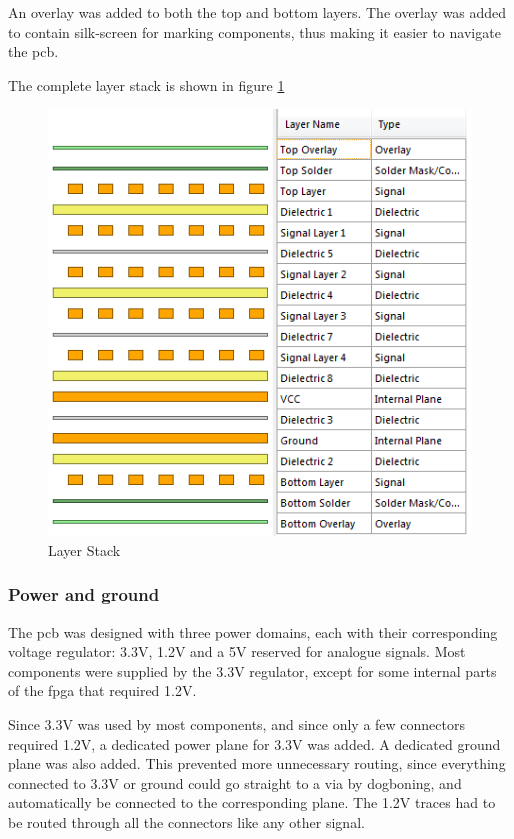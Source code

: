 An overlay was added to both the top and bottom layers.
The overlay was added to contain silk-screen for marking components, thus making it easier to navigate the \gls{pcb}.

The complete layer stack is shown in figure \ref{fig:Layers}

\begin{figure}[h!]
\centering
\includegraphics[scale = 0.8]{images/Layers.png}
\caption{Layer Stack}
\label{fig:Layers}
\end{figure}

\subsubsection{Power and ground}
\label{Power}
The \gls{pcb} was designed with three power domains, each with their corresponding voltage regulator: 3.3V, 1.2V and a 5V reserved for analogue signals.
Most components were supplied by the 3.3V regulator, except for some internal parts of the \gls{fpga} that required 1.2V.

Since 3.3V was used by most components, and since only a few connectors required 1.2V, a dedicated power plane for 3.3V was added.
A dedicated ground plane was also added.
This prevented more unnecessary routing, since everything connected to 3.3V or ground could go straight to a via by dogboning, and automatically be connected to the corresponding plane.
The 1.2V traces had to be routed through all the connectors like any other signal.

